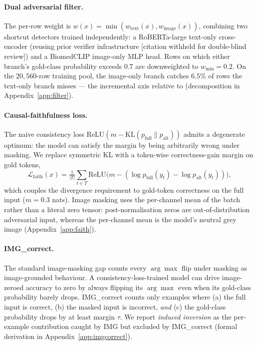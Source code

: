 \documentclass{article}
\begin{document}
\paragraph{Dual adversarial filter.} The per-row weight is
$w(x) = \min(w_{\text{text}}(x), w_{\text{image}}(x))$, combining
two shortcut detectors trained independently: a RoBERTa-large
text-only cross-encoder (reusing prior verifier infrastructure
[citation withheld for double-blind review]) and a BiomedCLIP
\citep{zhang2024biomedclip} image-only MLP head. Rows on which
either branch's gold-class probability exceeds $0.7$ are
downweighted to $w_{\min} = 0.2$. On the $20{,}560$-row training
pool, the image-only branch catches $6.5\%$ of rows the text-only
branch misses --- the incremental axis relative to
\citet{li2025sfc} (decomposition in Appendix~\ref{app:filter}).

\paragraph{Causal-faithfulness loss.} The naive consistency loss
$\mathrm{ReLU}(m - \mathrm{KL}(p_{\mathrm{full}}\|p_{\mathrm{alt}}))$
admits a degenerate optimum: the model can satisfy the margin by
being arbitrarily wrong under masking. We replace symmetric KL with
a token-wise correctness-gain margin on gold tokens,
\begin{equation}
\mathcal{L}_{\mathrm{faith}}(x) =
\tfrac{1}{|T|}\!\sum_{t \in T}\mathrm{ReLU}\!\bigl(m -
(\log p_{\mathrm{full}}(y_t) - \log p_{\mathrm{alt}}(y_t))\bigr),
\end{equation}
which couples the divergence requirement to gold-token correctness
on the full input ($m = 0.3$ nats). Image masking uses the
per-channel mean of the batch rather than a literal zero tensor:
post-normalisation zeros are out-of-distribution adversarial input,
whereas the per-channel mean is the model's neutral grey image
(Appendix~\ref{app:faith}).

\paragraph{IMG\_correct.} The standard image-masking gap counts
every $\arg\max$ flip under masking as image-grounded behaviour. A
consistency-loss-trained model can drive image-zeroed accuracy to
zero by always flipping its $\arg\max$ even when its gold-class
probability barely drops. IMG\_correct counts only examples where
(a) the full input is correct, (b) the masked input is incorrect,
\emph{and} (c) the gold-class probability drops by at least margin
$\tau$. We report \emph{induced inversion} as the per-example
contribution caught by IMG but excluded by IMG\_correct (formal
derivation in Appendix~\ref{app:imgcorrect}).
\end{document}
